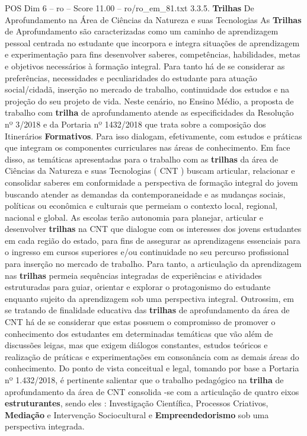 \begin{textsample}{POS Dim 6 – ro – Score 11.00 – ro/ro\_em\_81.txt}  \label{ex:f6_pos_133}
3.3.5. \textbf{Trilhas} De Aprofundamento na Área de Ciências da Natureza e suas Tecnologias As \textbf{Trilhas} de Aprofundamento são caracterizadas como um caminho de aprendizagem pessoal centrada no estudante que incorpora e integra situações de aprendizagem e experimentação para fins desenvolver saberes, competências, habilidades, metas e objetivos necessários à formação integral.
Para tanto há de se considerar as preferências, necessidades e peculiaridades do estudante para atuação social/cidadã, inserção no mercado de trabalho, continuidade dos estudos e na projeção do seu projeto de vida.
Neste cenário, no Ensino Médio, a proposta de trabalho com \textbf{trilha} de aprofundamento atende as especificidades da Resolução nº 3/2018 e da Portaria nº 1432/2018 que trata sobre a composição dos Itinerários \textbf{Formativos}.
Para isso dialogam, efetivamente, com estudos e práticas que integram os componentes curriculares nas áreas de conhecimento.
Em face disso, as temáticas apresentadas para o trabalho com as \textbf{trilhas} da área de Ciências da Natureza e suas Tecnologias ( CNT ) buscam articular, relacionar e consolidar saberes em conformidade a perspectiva de formação integral do jovem buscando atender as demandas da contemporaneidade e as mudanças sociais, políticas ou econômica e culturais que permeiam o contexto local, regional, nacional e global.
As escolas terão autonomia para planejar, articular e desenvolver \textbf{trilhas} na CNT que dialogue com os interesses dos jovens estudantes em cada região do estado, para fins de assegurar as aprendizagens essenciais para o ingresso em cursos superiores e/ou continuidade no seu percurso profissional para inserção no mercado de trabalho.
Para tanto, a articulação da aprendizagem nas \textbf{trilhas} permeia sequências integradas de experiências e atividades estruturadas para guiar, orientar e explorar o protagonismo do estudante enquanto sujeito da aprendizagem sob uma perspectiva integral.
Outrossim, em se tratando de finalidade educativa das \textbf{trilhas} de aprofundamento da área de CNT há de se considerar que estas possuem o compromisso de promover o conhecimento dos estudantes em determinadas temáticas que vão além de discussões leigas, mas que exigem diálogos constantes, estudos teóricos e realização de práticas e experimentações em consonância com as demais áreas do conhecimento.
Do ponto de vista conceitual e legal, tomando por base a Portaria nº 1.432/2018, é pertinente salientar que o trabalho pedagógico na \textbf{trilha} de aprofundamento da área de CNT consolida -se com a articulação de quatro eixos \textbf{estruturantes}, sendo eles : Investigação Científica, Processos Criativos, \textbf{Mediação} e Intervenção Sociocultural e \textbf{Empreendedorismo} sob uma perspectiva integrada.

\end{textsample}
